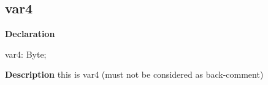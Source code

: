 \documentclass{report}
\newif\ifpdf
\begin{document}
\subsection*{var4}
\fi
\label{ok_auto_back_comments-var4}
\begin{list}{}{
\setlength{\itemindent}{0cm}
\setlength{\listparindent}{0cm}
\setlength{\leftmargin}{\evensidemargin}
\addtolength{\leftmargin}{\tmplength}
\settowidth{\labelsep}{X}
\addtolength{\leftmargin}{\labelsep}
\setlength{\labelwidth}{\tmplength}
}
\item[\textbf{Declaration}\hfill]
\ifpdf
\begin{flushleft}
\fi
\begin{ttfamily}
var4: Byte;\end{ttfamily}

\ifpdf
\end{flushleft}
\fi

\par
\item[\textbf{Description}]
this is var4 (must not be considered as back{-}comment)

\end{list}
\end{document}
